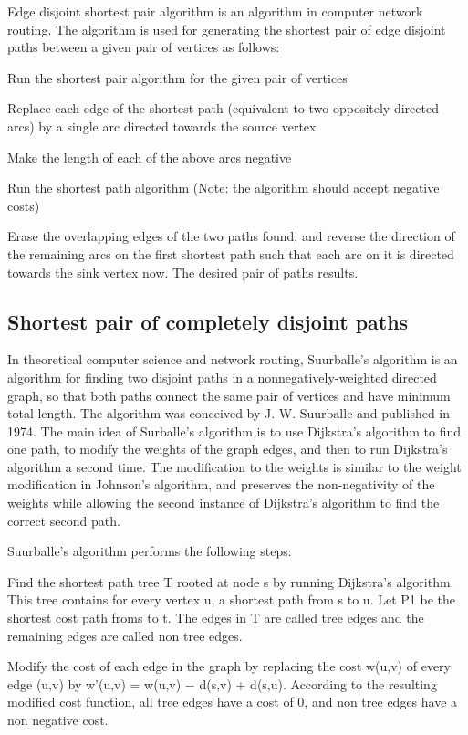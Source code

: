 \documentclass[10pt,letterpaper,twocolumn,twosided]{article}
\begin{document}
Edge disjoint shortest pair algorithm is an algorithm in computer network routing. The algorithm 
is used for generating the shortest pair of edge disjoint paths between a given pair of vertices as follows:

Run the shortest pair algorithm for the given pair of vertices

Replace each edge of the shortest path (equivalent to two oppositely directed arcs) by a single arc directed 
towards the source vertex

Make the length of each of the above arcs negative

Run the shortest path algorithm (Note: the algorithm should accept negative costs)

Erase the overlapping edges of the two paths found, and reverse the direction of the remaining arcs on the 
first shortest path such that each arc on it is directed towards the sink vertex now. The desired pair of 
paths results.

\subsection{Shortest pair of completely disjoint paths}

In theoretical computer science and network routing, Suurballe's algorithm is an algorithm for finding two
disjoint paths in a nonnegatively-weighted directed graph, so that both paths connect the same pair of vertices
and have minimum total length. The algorithm was conceived by J. W. Suurballe and published in 1974. The main idea
of Surballe's algorithm is to use Dijkstra's algorithm to find one path, to modify the weights of the graph edges,
and then to run Dijkstra's algorithm a second time. The modification to the weights is similar to the weight 
modification in Johnson's algorithm, and preserves the non-negativity of the weights while allowing the second
instance of Dijkstra's algorithm to find the correct second path.

Suurballe's algorithm performs the following steps:

Find the shortest path tree T rooted at node s by running Dijkstra's algorithm. This tree contains for every vertex u,
a shortest path from s to u. Let P1 be the shortest cost path froms to t. The edges in T are called tree edges
and the remaining edges are called non tree edges.

Modify the cost of each edge in the graph by replacing the cost w(u,v) of every edge (u,v) 
by w'(u,v) = w(u,v) − d(s,v) + d(s,u). According to the resulting modified cost function, all tree edges have a
cost of 0, and non tree edges have a non negative cost.
\end{document}
